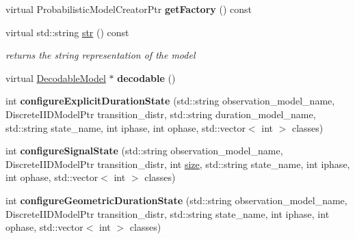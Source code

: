 \begin{DoxyCompactItemize}
\mbox{\label{classtops_1_1GeneralizedHiddenMarkovModel_aa5388fadc9e63c0d7e254cdbc7f88974}} 
virtual Probabilistic\+Model\+Creator\+Ptr {\bfseries get\+Factory} () const
\item 
\mbox{\label{classtops_1_1GeneralizedHiddenMarkovModel_ae6cef52f4472e6a15b904c4d3241d75c}} 
virtual std\+::string \hyperlink{classtops_1_1GeneralizedHiddenMarkovModel_ae6cef52f4472e6a15b904c4d3241d75c}{str} () const
\begin{DoxyCompactList}\small\item\em returns the string representation of the model \end{DoxyCompactList}\item 
\mbox{\label{classtops_1_1GeneralizedHiddenMarkovModel_a52b62c9be9188b0871ad31a16cc26cac}} 
virtual \hyperlink{classtops_1_1DecodableModel}{Decodable\+Model} $\ast$ {\bfseries decodable} ()
\item 
\mbox{\label{classtops_1_1GeneralizedHiddenMarkovModel_a01ced5a47f960c33a4a75fe590d104e9}} 
int {\bfseries configure\+Explicit\+Duration\+State} (std\+::string observation\+\_\+model\+\_\+name, Discrete\+I\+I\+D\+Model\+Ptr transition\+\_\+distr, std\+::string duration\+\_\+model\+\_\+name, std\+::string state\+\_\+name, int iphase, int ophase, std\+::vector$<$ int $>$ classes)
\item 
\mbox{\label{classtops_1_1GeneralizedHiddenMarkovModel_a1f4489eece946b60cb47e994f2a8a111}} 
int {\bfseries configure\+Signal\+State} (std\+::string observation\+\_\+model\+\_\+name, Discrete\+I\+I\+D\+Model\+Ptr transition\+\_\+distr, int \hyperlink{classtops_1_1ProbabilisticModel_a4e3910e9b9b848b7078e7101909ae82a}{size}, std\+::string state\+\_\+name, int iphase, int ophase, std\+::vector$<$ int $>$ classes)
\item 
\mbox{\label{classtops_1_1GeneralizedHiddenMarkovModel_ac7fa2ff4ef33b9a5aebae230a3f99294}} 
int {\bfseries configure\+Geometric\+Duration\+State} (std\+::string observation\+\_\+model\+\_\+name, Discrete\+I\+I\+D\+Model\+Ptr transition\+\_\+distr, std\+::string state\+\_\+name, int iphase, int ophase, std\+::vector$<$ int $>$ classes)

\end{DoxyCompactItemize}
